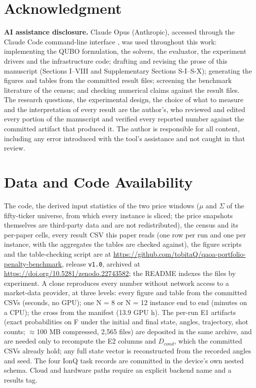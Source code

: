 \documentclass{ieeeaccess}
\begin{document}
\section*{Acknowledgment}


\textbf{AI assistance disclosure.} Claude Opus (Anthropic), accessed through the Claude Code command-line interface \cite{ref47}, was used throughout this work: implementing the QUBO formulation, the solvers, the evaluator, the experiment drivers and the infrastructure code; drafting and revising the prose of this manuscript (Sections I--VIII and Supplementary Sections S-I--S-X); generating the figures and tables from the committed result files; screening the benchmark literature of the census; and checking numerical claims against the result files. The research questions, the experimental design, the choice of what to measure and the interpretation of every result are the author's, who reviewed and edited every portion of the manuscript and verified every reported number against the committed artifact that produced it. The author is responsible for all content, including any error introduced with the tool's assistance and not caught in that review.


\section*{Data and Code Availability}

The code, the derived input statistics of the two price windows ($\mu$ and $\Sigma$ of the fifty-ticker universe, from which every instance is sliced; the price snapshots themselves are third-party data and are not redistributed), the census and its per-paper cells, every result CSV this paper reads (one row per run and one per instance, with the aggregates the tables are checked against), the figure scripts and the table-checking script are at \url{https://github.com/tobitaQ/qaoa-portfolio-penalty-benchmark}, release \texttt{v1.0}, archived at \url{https://doi.org/10.5281/zenodo.22743582}; the README indexes the files by experiment. A clone reproduces every number without network access to a market-data provider, at three levels: every figure and table from the committed CSVs (seconds, no GPU); one N = 8 or N = 12 instance end to end (minutes on a CPU); the cross from the manifest (13.9 GPU h). The per-run E1 artifacts (exact probabilities on F under the initial and final state, angles, trajectory, shot counts; $\approx$100 MB compressed, 2,565 files) are deposited in the same archive, and are needed only to recompute the E2 columns and $D_{cond}$, which the committed CSVs already hold; any full state vector is reconstructed from the recorded angles and seed. The four IonQ task records are committed in the device's own nested schema. Cloud and hardware paths require an explicit backend name and a results tag.
\end{document}
